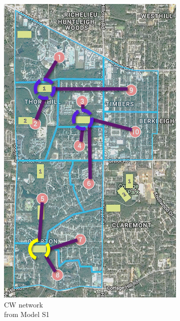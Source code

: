 \documentclass[preprint,12pt,authoryear]{elsarticle}
\begin{document}
\begin{figure}[!htb]
\begin{subfigure}[b]{0.4\textwidth}
		\includegraphics[width=\textwidth]{s1.png}
		\caption{CW network \\from Model S1}
		\label{fig:networks1}
	\end{subfigure}
	\begin{subfigure}[b]{0.4\textwidth}

\end{subfigure}
\end{figure}
\end{document}

